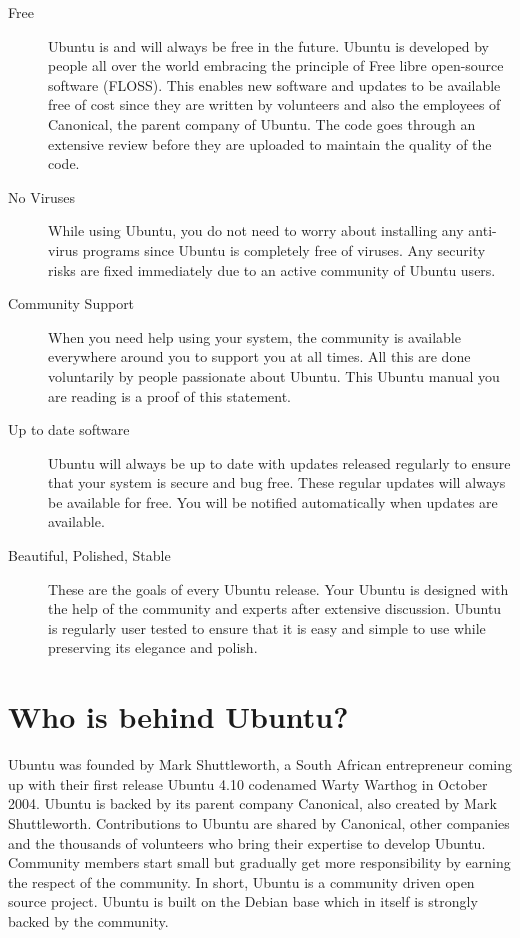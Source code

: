 \begin{description}
\item [Free] Ubuntu is and will always be free in the future. Ubuntu is developed by people all over the world embracing the principle of Free libre open-source software (FLOSS). This enables new software and updates to be available free of cost since they are written by volunteers and also the employees of Canonical, the parent company of Ubuntu. The code goes through an extensive review before they are uploaded to maintain the quality of the code.

\item [No Viruses] While using Ubuntu, you do not need to worry about installing any anti-virus programs since Ubuntu is completely free of viruses. Any security risks are fixed immediately due to an active community of Ubuntu users. 

\item [Community Support] When you need help using your system, the community is available everywhere around you to support you at all times. All this are done voluntarily by people passionate about Ubuntu. This Ubuntu manual you are reading is a proof of this statement. 

\item [Up to date software] Ubuntu will always be up to date with updates released regularly to ensure that your system is secure and bug free. These regular updates will always be available for free. You will be notified automatically when updates are available.

\item [Beautiful, Polished, Stable] These are the goals of every Ubuntu release. Your Ubuntu is designed with the help of the community and experts after extensive discussion. Ubuntu is regularly user tested to ensure that it is easy and simple to use while preserving its elegance and polish.
\end{description}

\section{Who is behind Ubuntu?} \label{chap:about_ubuntu_who} 
Ubuntu was founded by Mark Shuttleworth, a South African entrepreneur coming up with their first release Ubuntu 4.10 codenamed Warty Warthog in October 2004. Ubuntu is backed by its parent company Canonical, also created by Mark Shuttleworth. Contributions to Ubuntu are shared by Canonical, other companies and the thousands of volunteers who bring their expertise to develop Ubuntu. Community members start small but gradually get more responsibility by earning the respect of the community. In short, Ubuntu is a community driven open source project. Ubuntu is built on the Debian base which in itself is strongly backed by the community.


